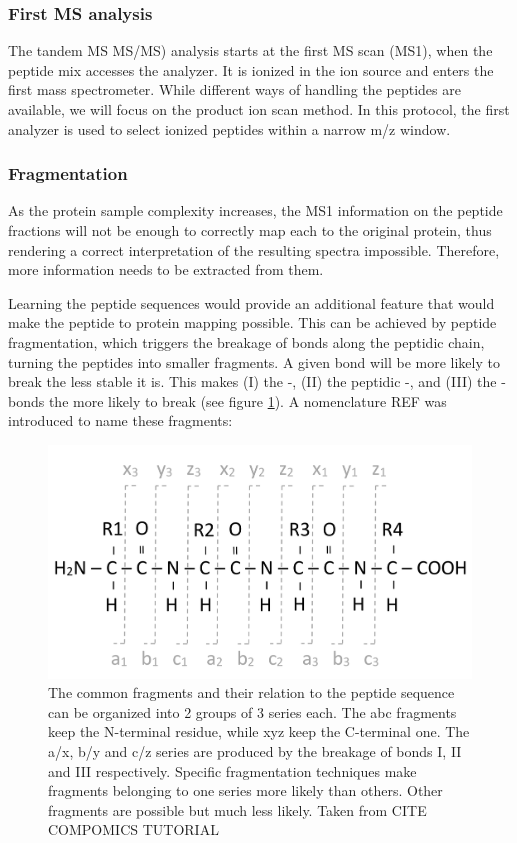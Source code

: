 \documentclass[11pt, a4paper]{report}
\begin{document}
\subsubsection{First MS analysis}

The tandem MS \ac{MS/MS}) analysis starts at the first \ac{MS} scan (\ac{MS1}), when the peptide mix accesses the analyzer. It is ionized in the ion source and enters the first mass spectrometer. While different ways of handling the peptides are available, we will focus on the product ion scan method. In this protocol, the first analyzer is used to select ionized peptides within a narrow m/z window.


\subsubsection{Fragmentation}
\label{subsubsec:fragmentation}

As the protein sample complexity increases, the \ac{MS1} information on the peptide fractions will not be enough to correctly map each to the original protein, thus rendering a correct interpretation of the resulting spectra impossible. Therefore, more information needs to be extracted from them.

Learning the peptide sequences would provide an additional feature that would make the peptide to protein mapping possible. This can be achieved by peptide fragmentation, which triggers the breakage of bonds along the peptidic chain, turning the peptides into smaller fragments. A given bond will be more likely to break the less stable it is. This makes (I) the -, (II) the peptidic -, and (III) the - bonds the more likely to break (see figure \ref{fig:abcxyz}). A nomenclature REF was introduced to name these fragments:

\begin{figure}[!h]
\includegraphics[width=\textwidth]{abcxyz}
\caption{The common fragments and their relation to the peptide sequence can be organized into 2 groups of 3 series each. The abc fragments keep the N-terminal residue, while xyz keep the C-terminal one. The a/x, b/y and c/z series are produced by the breakage of bonds I, II and III respectively. Specific fragmentation techniques make fragments belonging to one series more likely than others. Other fragments are possible but much less likely. Taken from CITE COMPOMICS TUTORIAL}
\label{fig:abcxyz}
\end{figure}
\end{document}
